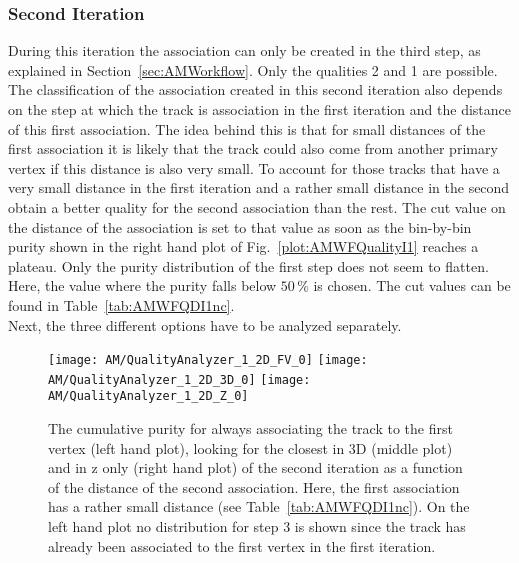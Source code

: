 

\subsubsection{Second Iteration}

During this iteration the association can only be created in the third step, as explained in Section~\ref{sec:AMWorkflow}. Only the qualities 2 and 1 are possible. The classification of the association created in this second iteration also depends on the step at which the track is association in the first iteration and the distance of this first association. The idea behind this is that for small distances of the first association it is likely that the track could also come from another primary vertex if this distance is also very small. To account for those tracks that have a very small distance in the first iteration and a rather small distance in the second obtain a better quality for the second association than the rest. The cut value on the distance of the association is set to that value as soon as the bin-by-bin purity shown in the right hand plot of Fig.~\ref{plot:AMWFQualityI1} reaches a plateau. Only the purity distribution of the first step does not seem to flatten. Here, the value where the purity falls below $50\,\%$ is chosen. The cut values can be found in Table~\ref{tab:AMWFQDI1nc}.\\
Next, the three different options have to be analyzed separately.



\begin{figure}[!ht]
    \centering
    \texttt{[image: AM/QualityAnalyzer\_1\_2D\_FV\_0]}
    \texttt{[image: AM/QualityAnalyzer\_1\_2D\_3D\_0]}
    \texttt{[image: AM/QualityAnalyzer\_1\_2D\_Z\_0]}
    \caption[Cumulative purity of iteration two vs relative difference to define quality for smaller distances of association one]{The cumulative purity for always associating the track to the first vertex (left hand plot), looking for the closest in 3D (middle plot) and in z only (right hand plot) of the second iteration as a function of the distance of the second association. Here, the first association has a rather small distance (see Table~\ref{tab:AMWFQDI1nc}). On the left hand plot no distribution for step 3 is shown since the track has already been associated to the first vertex in the first iteration. \label{plot:AMWFQualityI20}}
\end{figure}

